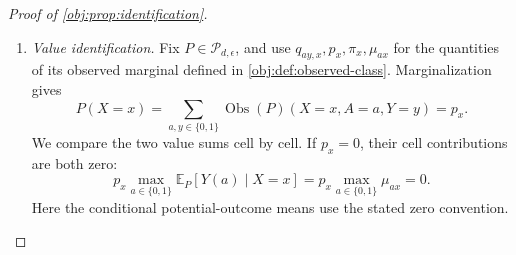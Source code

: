 \begin{proof}[Proof of \cref{obj:prop:identification}]
\begin{enumerate}
Summing over the observed outcome, and then using the observed-atom factorization supplied by \cref{obj:def:observed-class}, yields
\[
\begin{aligned}
&P(X=x,A=a,Y(0)=y_0,Y(1)=y_1)\\
&\quad=q_{a\,y_a,x}\operatorname{Bern}(\mu_{1-a,x};y_{1-a})\\
&\quad=p_x\operatorname{Bern}(\pi_x;a)
\operatorname{Bern}(\mu_{0x};y_0)
\operatorname{Bern}(\mu_{1x};y_1).
\end{aligned}
\]
Consequently, summing these factors over the remaining binary coordinates gives, for \(a,a',y\in\{0,1\}\),
\[
\begin{aligned}
P(X=x)&=p_x,\\
P(X=x,A=a')&=p_x\operatorname{Bern}(\pi_x;a'),\\
P(X=x,Y(a)=y)&=p_x\operatorname{Bern}(\mu_{ax};y),\\
P(X=x,A=a',Y(a)=y)
&=p_x\operatorname{Bern}(\pi_x;a')
\operatorname{Bern}(\mu_{ax};y).
\end{aligned}
\]
Multiplication therefore gives
\[
\begin{aligned}
&P(X=x,A=a',Y(a)=y)\,P(X=x)\\
&\qquad=P(X=x,A=a')\,P(X=x,Y(a)=y).
\end{aligned}
\]
On positive-mass cells, division by \(p_x^2\) proves \cref{obj:ass:conditional-exchangeability}; on null cells both products are zero.

For each observed atom, the construction also gives
\[
\begin{aligned}
P(X=x,A=a,Y=y)
&=q_{ay,x}
\bigl\{
\operatorname{Bern}(\mu_{1-a,x};0)
+\operatorname{Bern}(\mu_{1-a,x};1)
\bigr\}\\
&=q_{ay,x}.
\end{aligned}
\]
Hence
\[
\operatorname{Obs}(P)=\mathbb P.
\]
The observed marginal inherits the overlap restriction of \(\mathbb P\). Together with consistency and conditional exchangeability, this puts \(P\) in the class of \cref{obj:def:causal-class}, proving the completion assertion.

\item \emph{Value identification.}
Fix \(P\in\mathcal P_{d,\epsilon}\), and use \(q_{ay,x},p_x,\pi_x,\mu_{ax}\) for the quantities of its observed marginal defined in \cref{obj:def:observed-class}. Marginalization gives
\[
P(X=x)
=\sum_{a,y\in\{0,1\}}
\operatorname{Obs}(P)(X=x,A=a,Y=y)
=p_x.
\]
We compare the two value sums cell by cell. If \(p_x=0\), their cell contributions are both zero:
\[
p_x\max_{a\in\{0,1\}}\mathbb E_P[Y(a)\mid X=x]
=
p_x\max_{a\in\{0,1\}}\mu_{ax}
=0.
\]
Here the conditional potential-outcome means use the stated zero convention.


\end{enumerate}
\end{proof}
